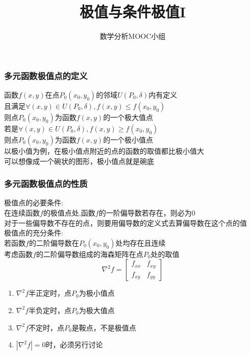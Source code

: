 \documentclass[xetex]{beamer}
\title{极值与条件极值I}
\author{数学分析MOOC小组}
\date{}
\begin{document}
\frame{\maketitle}

\begin{frame}
	\frametitle{多元函数极值点的定义}
	函数$f(x,y)$在点$P_0(x_0,y_0)$的邻域$U(P_0,\delta)$内有定义\\
	且满足$\forall (x,y) \in U(P_0,\delta),f(x,y)\leq f(x_0,y_0)$\\
	则点$P_0(x_0,y_0)$为函数$f(x,y)$的一个极大值点\\ \pause
	若是$\forall (x,y) \in U(P_0,\delta),f(x,y)\geq f(x_0,y_0)$\\
	则点$P_0(x_0,y_0)$为函数$f(x,y)$的一个极小值点\\ \pause
	以极小值为例，在极小值点附近的点的函数的取值都比极小值大\\
	可以想像成一个碗状的图形，极小值点就是碗底\\ 
\end{frame}

\begin{frame}
	\frametitle{多元函数极值点的性质}
	极值点的必要条件:\\
	在连续函数$f$的极值点处,函数$f$的一阶偏导数若存在，则必为0\\ 
	对于一些偏导数不存在的点，则要用偏导数的定义式去算偏导数在这个点的值\\ \pause
	极值点的充分条件:\\
	若函数$f$的二阶偏导数在$P_0(x_0,y_0)$处均存在且连续\\ \pause
	考虑函数$f$的二阶偏导数组成的海森矩阵在点$P_0$处的取值$$\nabla^2f=
	\left[
		\begin{matrix}
			f_{xx} & f_{xy}\\
			f_{xy} & f_{yy}
		\end{matrix}
	\right]$$ \pause
	\begin{enumerate}
		\item$\nabla^2f$半正定时，点$P_0$为极小值点\\
		\item$\nabla^2f$半负定时，点$P_0$为极大值点\\
		\item$\nabla^2f$不定时，点$P_0$是鞍点，不是极值点\\
		\item$|\nabla^2f|=0$时，必须另行讨论\\
	\end{enumerate}

\end{frame}
\end{document}
